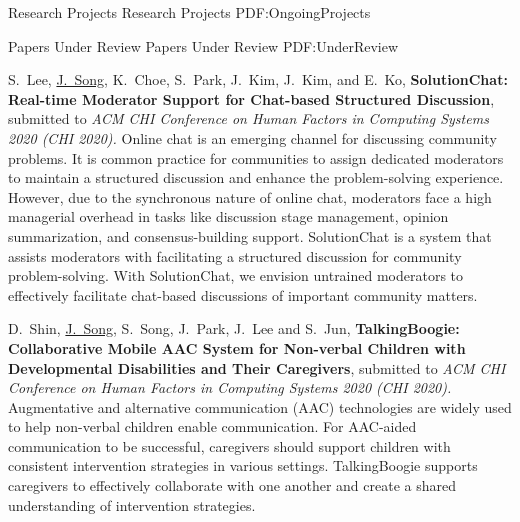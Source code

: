 \documentclass[letterpaper,MMMyyyy,nonstopmode]{template}
\begin{document}
\begin{Body}
\endgroup

\newpage


\BigGap
\Section
{Research Projects}
{Research Projects}
{PDF:OngoingProjects}

\SubSection
{Papers Under Review}
{Papers Under Review}
{PDF:UnderReview}

\begingroup
\renewcommand{\MaxNumberedItem}{[88]}

\BigGap
\NumberedItem{[3]}
S.~Lee, \underline{J.~Song}, K.~Choe, S.~Park, J.~Kim, J.~Kim, and E.~Ko,
\textbf{SolutionChat: Real-time Moderator Support for Chat-based Structured Discussion},
submitted to \textit{ACM CHI Conference on Human Factors in Computing Systems 2020 (CHI 2020).}
\vspace{2mm}\newline
{\small{
  Online chat is an emerging channel for discussing community problems. It is common practice for communities to assign dedicated moderators to maintain a structured discussion and enhance the problem-solving experience. However, due to the synchronous nature of online chat, moderators face a high managerial overhead in tasks like discussion stage management, opinion summarization, and consensus-building support. SolutionChat is a system that assists moderators with facilitating a structured discussion for community problem-solving.
  With SolutionChat, we envision untrained moderators to effectively facilitate chat-based discussions of important community matters.
}}


\BigGap
\NumberedItem{[4]}
D.~Shin, \underline{J.~Song}, S.~Song, J.~Park, J.~Lee and S.~Jun,
\textbf{TalkingBoogie: Collaborative Mobile AAC System for Non-verbal Children with Developmental Disabilities and Their Caregivers},
submitted to \textit{ACM CHI Conference on Human Factors in Computing Systems 2020 (CHI 2020).}
\vspace{2mm}\newline
{\small{
  Augmentative and alternative communication (AAC) technologies are widely used to help non-verbal children enable communication. For AAC-aided communication to be successful, caregivers should support children with consistent intervention strategies in various settings. TalkingBoogie supports caregivers to effectively collaborate with one another and create a shared understanding of intervention strategies.
}}


\end{Body}
\end{document}
